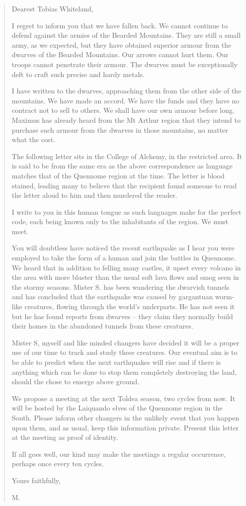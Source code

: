 \begin{quotation}
Dearest Tobias Whiteland,

I regret to inform you that we have fallen back.  We cannot continue to defend against the armies of the Bearded Mountains.  They are still a small army, as we expected, but they have obtained superior armour from the dwarves of the Bearded Mountains.  Our arrows cannot hurt them.  Our troops cannot penetrate their armour.  The dwarves must be exceptionally deft to craft such precise and hardy metals.

	I have written to the dwarves, approaching them from the other side of the mountains.  We have made an accord.  We have the funds and they have no contract not to sell to others.  We shall have our own armour before long.  Maximus has already heard from the Mt Arthur region that they intend to purchase such armour from the dwarves in those mountains, no matter what the cost.

The following letter sits in the College of Alchemy, in the restricted area.   It is said to be from the same era as the above correspondence as language matches that of the Quennome region at the time.  The letter is blood stained, leading many to believe that the recipient found someone to read the letter aloud to him and then murdered the reader.

I write to you in this human tongue as such languages make for the perfect code, each being known only to the inhabitants of the region.  We must meet.

	You will doubtless have noticed the recent earthquake as I hear you were employed to take the form of a human and join the battles in Quennome.  We heard that in addition to felling many castles, it upset every volcano in the area with more bluster than the usual soft lava flows and smog seen in the stormy seasons.  Mister S. has been wandering the dwarvish tunnels and has concluded that the earthquake was caused by gargantuan worm-like creatures, flowing through the world's underparts.  He has not seen it but he has found reports from dwarves -- they claim they normally build their homes in the abandoned tunnels from these creatures.

	Mister S, myself and like minded changers have decided it will be a proper use of our time to track and study these creatures.  Our eventual aim is to be able to predict when the next earthquakes will rise and if there is anything which can be done to stop them completely destroying the land, should the chose to emerge above ground.

	We propose a meeting at the next Toldea season, two cycles from now.  It will be hosted by the Laiquando elves of the Quennome region in the South.  Please inform other changers in the unlikely event that you happen upon them, and as usual, keep this information private.  Present this letter at the meeting as proof of identity.

	If all goes well, our kind may make the meetings a regular occurrence, perhaps once every ten cycles.

	Yours faithfully,

	M.
\end{quotation}

